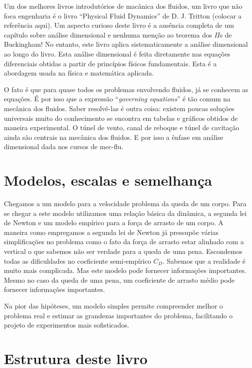 Um dos melhores livros introdutórios de macânica dos fluidos, um livro que não foca  engenharia é o livro ``Physical Fluid Dynamics'' de D. J. Tritton (colocar a referência aqui). Um aspecto curioso deste livro é a ausência completa de um capítulo sobre análise dimensional e nenhuma menção ao teorema dos $\Pi$s de Buckingham! No entanto, este livro aplica sistematicamente a análise dimensional ao longo do livro. Esta análise dimensional é feita diretamente nas equações diferenciais obtidas a partir de princípios físicos fundamentais. Esta é a abordagem usada na física e matemática aplicada.

O fato é que para quase todos os problemas envolvendo fluidos, já se conhecem as equações. É por isso que a expressão ``\emph{governing equations}'' é tão comum na mecânica dos fluidos. Saber resolvê-las é outra coisa: existem poucas soluções universais muito do conhecimento se encontra em tabelas e gráficos obtidos de maneira experimental. O túnel de vento, canal de reboque e túnel de cavitação ainda são centrais na mecânica dos fluidos. E por isso a ênfase em análise dimensional dada nos cursos de mec-flu.

\section{Modelos, escalas e semelhança}
Chegamos a um modelo para a velocidade  problema da queda de um corpo. Para se chegar a este modelo utilizamos uma relação básica da dinâmica, a segunda lei de Newton e um modelo empírico para a força de arrasto de um corpo. A maneira como empregamos a segunda lei de Newton já pressupõe várias simplificações no problema como o fato da força de arrasto estar alinhado com a vertical o que sabemos não ser verdade para a queda de uma pena. Escondemos todas as dificuldades no coeficiente semi-empírico $C_D$. Sabemos que a realidade é muito mais complicada. Mas este modelo pode fornecer informações importantes. Mesmo no caso da queda de uma pena, um coeficiente de arrasto médio pode fornecer informações importantes.

Na pior das hipóteses, um modelo simples permite compreender melhor o problema real e estimar as grandezas importantes do problema, facilitando o projeto de experimentos mais sofisticados.

\section{Estrutura deste livro}

